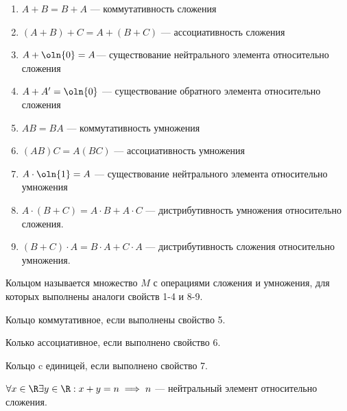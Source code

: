 \begin{enumerate}
    \item $A + B = B + A$ --- коммутативность сложения
    
    \item $(A + B) + C = A + (B + C)$ --- ассоциативность сложения
    
    \item $A + \oln{0} = A$--- существование нейтрального элемента относительно сложения
    
    \item $A + A' = \oln{0}$ --- существование обратного элемента относительно сложения
    
    \item $AB = BA$ --- коммутативность умножения
    
    \item $(AB)C = A(BC)$ --- ассоциативность умножения
    
    \item $A \cdot \oln{1} = A$ --- существование нейтрального элемента относительно умножения
    
    \item $A \cdot (B + C) = A \cdot B + A \cdot C$ --- дистрибутивность умножения относительно сложения.
    
    \item $(B + C) \cdot A = B \cdot A + C \cdot A$ --- дистрибутивность сложения относительно умножения.
\end{enumerate}

\begin{defn}
    Кольцом называется множество $M$ с операциями сложения и умножения, для которых выполнены аналоги свойств 1-4 и 8-9.
\end{defn}

\begin{defn}
    Кольцо коммутативное, если выполнены свойство 5.
\end{defn}

\begin{defn}
    Колько ассоциативное, если выполнено свойство 6.
\end{defn}

\begin{defn}
    Кольцо c единицей, если выполнено свойство 7.
\end{defn}

\begin{defn}
    $\forall x \in \R \exists y \in \R: x + y = n \implies n$ --- нейтральный элемент относительно сложения.
\end{defn}    

